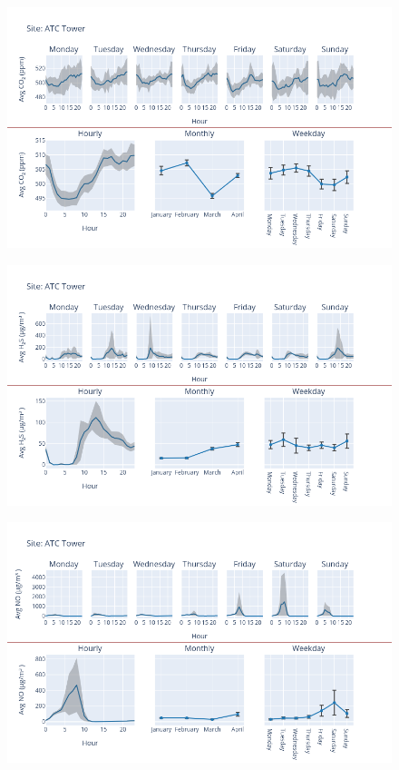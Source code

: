 \documentclass[12pt, oneside]{book}
\begin{document}
{ 
{\begin{figure}[H] 
 \centering 
\includegraphics[width=.88\textwidth, keepaspectratio]{image56} 
 \end{figure}}{} 

{\begin{figure}[H] 
 \centering 
\includegraphics[width=.88\textwidth, keepaspectratio]{image57} 
 \end{figure}}{} 

{\begin{figure}[H] 
 \centering 
\includegraphics[width=.88\textwidth, keepaspectratio]{image58} 
 \end{figure}}{} 

}
\end{document}
